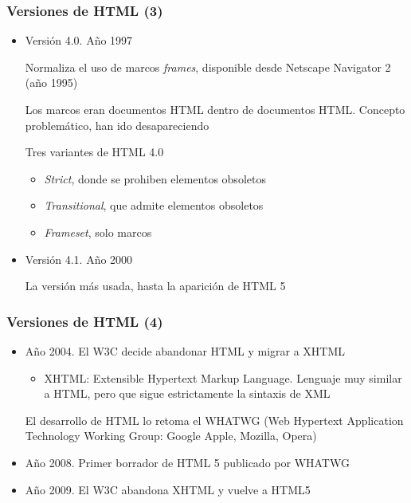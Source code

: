 \documentclass[ucs]{beamer}
\begin{document}
\begin{frame}[fragile]
\frametitle{Versiones de HTML (3)}
\begin{itemize}
\item
Versión 4.0.
Año 1997 

Normaliza el uso de marcos \emph{frames}, disponible desde Netscape Navigator 2 (año 1995)

Los marcos eran documentos HTML dentro de documentos HTML. Concepto problemático, han ido
desapareciendo

Tres variantes de HTML 4.0
    \begin{itemize}
    \item
\emph{Strict}, donde se prohiben elementos obsoletos
    \item
\emph{Transitional}, que admite elementos obsoletos
    \item
\emph{Frameset}, solo marcos
    \end{itemize}

\item
Versión 4.1.
Año 2000 

La versión más usada, hasta la aparición de HTML 5

\end{itemize}
\end{frame}

\begin{frame}[fragile]
\frametitle{Versiones de HTML (4)}
\begin{itemize}

\item
Año 2004. El W3C decide abandonar HTML y migrar a XHTML 

    \begin{itemize}
    \item
XHTML: Extensible Hypertext Markup Language. Lenguaje muy similar
a HTML, pero que sigue estrictamente la sintaxis de XML
    \end{itemize}


El desarrollo de HTML lo retoma el WHATWG
(Web Hypertext Application Technology Working Group: Google Apple, Mozilla, Opera)

\item
Año 2008. Primer borrador de HTML 5 publicado por WHATWG

\item
Año 2009. El W3C abandona XHTML y vuelve a HTML5

\end{itemize}

\end{frame}
\end{document}

